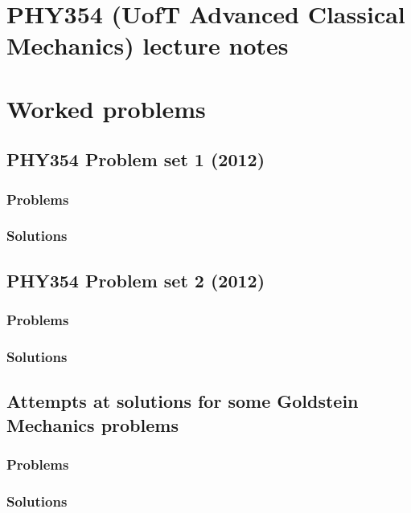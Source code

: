 \part{PHY354 (UofT Advanced Classical Mechanics) lecture notes}
   
   
   
   
   

\part{Worked problems}
   \chapter{PHY354 Problem set 1 (2012)}
      \section{Problems}
         
      \section{Solutions}
         \shipoutAnswer
   \chapter{PHY354 Problem set 2 (2012)}
      \section{Problems}
         
      \section{Solutions}
         \shipoutAnswer
   \chapter{Attempts at solutions for some Goldstein Mechanics problems}
      \section{Problems}
          
      \section{Solutions}
         \shipoutAnswer
